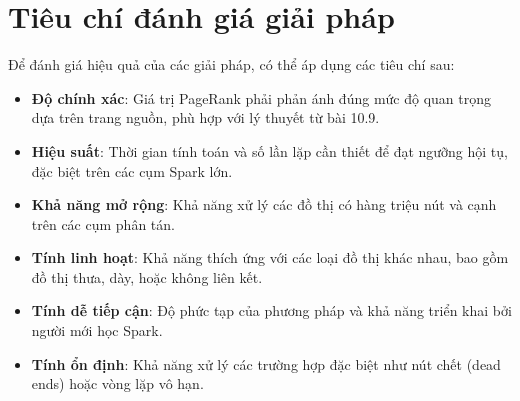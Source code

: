 \documentclass[conference]{IEEEtran}
\begin{document}
\section{Tiêu chí đánh giá giải pháp} \label{sec:criteria}
Để đánh giá hiệu quả của các giải pháp, có thể áp dụng các tiêu chí sau:
\begin{itemize}
    \item \textbf{Độ chính xác}: Giá trị PageRank phải phản ánh đúng mức độ quan trọng dựa trên trang nguồn, phù hợp với lý thuyết từ bài 10.9.
    \item \textbf{Hiệu suất}: Thời gian tính toán và số lần lặp cần thiết để đạt ngưỡng hội tụ, đặc biệt trên các cụm Spark lớn.
    \item \textbf{Khả năng mở rộng}: Khả năng xử lý các đồ thị có hàng triệu nút và cạnh trên các cụm phân tán.
    \item \textbf{Tính linh hoạt}: Khả năng thích ứng với các loại đồ thị khác nhau, bao gồm đồ thị thưa, dày, hoặc không liên kết.
    \item \textbf{Tính dễ tiếp cận}: Độ phức tạp của phương pháp và khả năng triển khai bởi người mới học Spark.
    \item \textbf{Tính ổn định}: Khả năng xử lý các trường hợp đặc biệt như nút chết (dead ends) hoặc vòng lặp vô hạn.
\end{itemize}
\end{document}
